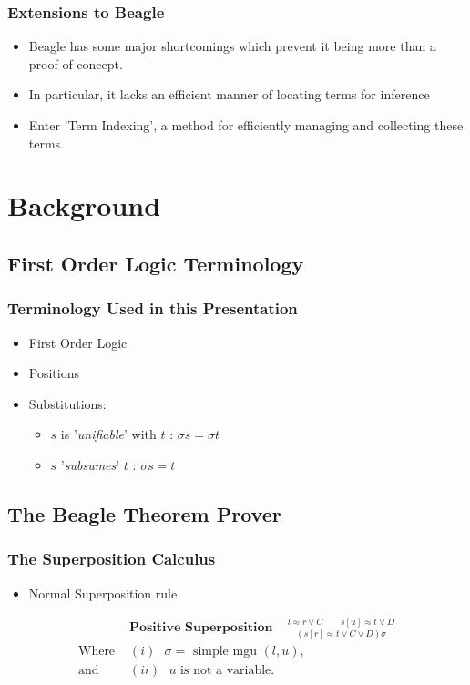 \documentclass[10pt,xcolor={dvipsnames}]{beamer}
\begin{document}
\begin{NoHyper}
\begin{frame}
  \frametitle{Extensions to Beagle}
  \begin{itemize}
  \item<1-> Beagle has some major shortcomings which prevent it being more than
  a proof of concept.
  \item<1-> In particular, it lacks an efficient manner of locating terms for inference
  \item<2-> Enter 'Term Indexing', a method for efficiently managing and collecting
  these terms.
  \end{itemize}
\end{frame}

\section{Background}

\subsection{First Order Logic Terminology}

\begin{frame}
  \frametitle{Terminology Used in this Presentation}
  \begin{itemize}
  \item<1-> First Order Logic
  \item<2-> Positions
  \item<3-> Substitutions:
    \begin{itemize}
    \item<3-> $s$ is '\emph{unifiable}' with $t$ : $\sigma s = \sigma t$
    \item<3-> $s$ '\emph{subsumes}' $t$ : $\sigma s = t$
    \end{itemize}
  \end{itemize}
\end{frame}

\subsection{The Beagle Theorem Prover}

\begin{frame}
  \frametitle{The Superposition Calculus}
  \begin{itemize}
  \item<1-> Normal Superposition rule
  \end{itemize}
  \begin{align*}
&\textbf{Positive Superposition}\ \ \ \ \  \frac{l \approx r \lor C\quad \quad s[u] \approx t \lor D}{(s[r] \approx t \lor C \lor D)\sigma}\\
\text{Where } &(i) \text{ $\sigma = $ simple mgu $(l,u)$,}\\
\text{and } &(ii) \text{ $u$ is not a variable.}
\end{align*}
\end{frame}


\end{NoHyper}
\end{document}
